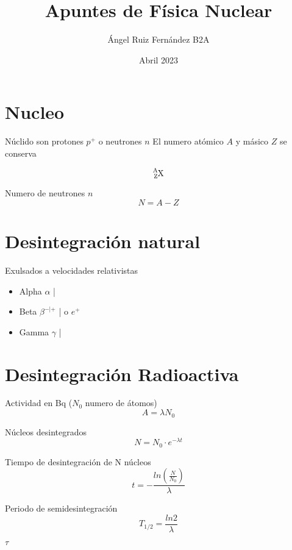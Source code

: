\documentclass[12pt, letterpaper, twoside]{article}
\title{Apuntes de Física Nuclear}
\author{Ángel Ruiz Fernández B2A}
\date{Abril 2023}
\begin{document}
	\maketitle
	
	\section{Nucleo}
	Núclido son protones $p^+$ o neutrones $n$
	El numero atómico $A$ y másico $Z$ se conserva
	
	\begin{equation}
		\ce{_{Z}^{A}X}
	\end{equation}

	Numero de neutrones $n$
	\begin{equation}
		N = A - Z
	\end{equation}

	\section{Desintegración natural}
	Exulsados a velocidades relativistas
	\begin{itemize}
		\item Alpha $\alpha$ | 
		\item Beta $\beta^{-|+}$ |  o $e^+$
		
		\item Gamma $\gamma$ | 
	\end{itemize}

	\section{Desintegración Radioactiva}
	Actividad en Bq ($N_0$ numero de átomos)
	\begin{equation}
		A = \lambda N_0
	\end{equation}
	
	Núcleos desintegrados
	\begin{equation}
		N = N_0 \cdot e^{-\lambda t}
	\end{equation}

	Tiempo de desintegración de N núcleos
	\begin{equation}
		t = - \frac{ln(\frac{N}{N_0})}{\lambda}
	\end{equation}

	Periodo de semidesintegración
	\begin{equation}
		T_{1/2} = \frac{ln 2}{\lambda}
	\end{equation}

$\tau$
\end{document}
